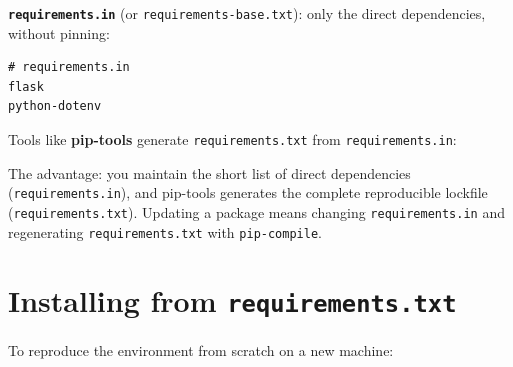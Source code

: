 \textbf{\texttt{requirements.in}} (or \texttt{requirements-base.txt}): only the direct dependencies, without pinning:

\begin{outputbox}[short]
\begin{Verbatim}[fontsize=\codesize, breaklines, breakanywhere, breaksymbolleft={\tiny\textcolor{muted}{$\hookrightarrow$}}]
# requirements.in
flask
python-dotenv
\end{Verbatim}
\end{outputbox}

\noindent{}Tools like \textbf{pip-tools} generate \texttt{requirements.txt} from \texttt{requirements.in}:

\begin{codebox}[short]

\begin{Shaded}
\begin{Highlighting}[]
\end{Highlighting}
\end{Shaded}

\end{codebox}

\noindent{}The advantage: you maintain the short list of direct dependencies (\texttt{requirements.in}), and pip-tools generates the complete reproducible lockfile (\texttt{requirements.txt}). Updating a package means changing \texttt{requirements.in} and regenerating \texttt{requirements.txt} with \texttt{pip-compile}.

\setcounter{section}{3}
\section{\texorpdfstring{Installing from \texttt{requirements.txt}}{Installing from requirements.txt}}\label{12-dependency-declaration:124-installing-from-requirementstxt}

To reproduce the environment from scratch on a new machine:

\begin{codebox}[short]

\begin{Shaded}
\begin{Highlighting}[]
 

\end{Highlighting}
\end{Shaded}

\end{codebox}


